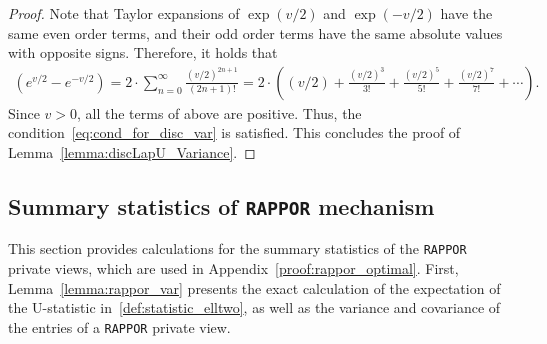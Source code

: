\documentclass[twoside,11pt]{article}
\begin{document}
\begin{appendix}
\begin{lemma}
\begin{proof}
			Note that Taylor expansions of $\exp(v/2)$ and $\exp(-v/2)$ have the same even order terms, and their odd order terms have the same absolute values with opposite signs. Therefore, it holds that
			\begin{align*}
				(e^{v/2} - e^{-v/2} ) = 2 \cdot \sum_{n=0}^{\infty} \frac{\left(v/2\right)^{2n+1}}{(2n+1)!} = 
				2\cdot
				\left(
				(v/2)
				+ 
				\frac{(v/2)^3}{3!}
				+
				\frac{(v/2)^5}{5!}
				+
				\frac{(v/2)^7}{7!}
				+ \cdots 
				\right).
			\end{align*}
			Since $v>0$, all the terms of above are positive. Thus, the condition~\eqref{eq:cond_for_disc_var} is satisfied. This concludes the proof of Lemma~\ref{lemma:discLapU_Variance}. 
		\end{proof}
	\end{lemma}
	
	\subsection{Summary statistics  of \texttt{RAPPOR} mechanism}\label{appendix:rappor_moment}
	This section provides calculations for the summary statistics of the \texttt{RAPPOR} private views, which are used in Appendix~\ref{proof:rappor_optimal}. First, Lemma~\ref{lemma:rappor_var} presents the exact calculation of the expectation of the U-statistic in~\eqref{def:statistic_elltwo}, as well as the variance and covariance of the entries of a \texttt{RAPPOR} private view.
	

\end{appendix}
\end{document}
